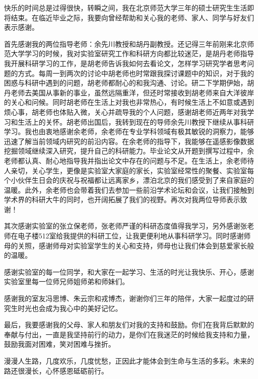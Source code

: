 
\begin{ack}
  快乐的时间总是过得很快，转瞬之间，我在北京师范大学三年的硕士研究生生活即将结束。在临近毕业之际，我要向曾经帮助和关心我的老师、家人、同学与好友们表示感谢。

  首先感谢我的两位指导老师：余先川教授和胡丹副教授。还记得三年前刚来北京师范大学学习的时候，我对实验室研究工作和科研方向都比较迷茫，是胡丹老师指导我开展科研学习的工作，是胡老师告诉我如何去看论文，怎样学习研究学者思考问题的方式。每周一到两次的讨论中胡老师也时常跟我探讨课题中的知识，对于我的困惑与科研中遇到的问题，胡老师都耐心的和我沟通、讨论。研二下学期伊始，胡丹老师去美国从事新的事业，虽然远隔重洋，但还时常接收到胡老师来自大洋彼岸的关心和问候。同时胡老师在生活上对我也非常热心，有时候生活上不如意或遇到烦心事，胡老师也体贴入微，关心并疏导我的个人问题，感谢胡老师近两年对我学习和生活上的关怀。胡老师出国后，我转到现在的导师余先川教授下继续从事科研学习。我也由衷地感谢余老师，余老师在专业学科领域有极其敏锐的洞察力，能够迅速了解当前领域内研究的前沿内容。在余老师的指导下，我能够在遥感影像数据挖掘领域继续深入研究，提升自己的科研能力。毕业论文从开题到撰写过程中，余老师都认真、耐心地指导我并指出论文中存在的问题与不足。在生活上，余老师待人亲切，关心学生，更像是实验室大家庭的家长，实验室经常性的聚餐、实验室每个小伙伴生日会的庆祝与祝福都让远离家乡，漂泊北京的我们感受到了来自家庭的温暖。此外，余老师也会带着我们去参加一些前沿学术论坛和会议，让我们接触到学术界的科研大牛的同时，也开阔拓展了我们的视野。再次对我两位导师表示致谢！

  其次感谢实验室的张立保老师，张老师严谨的科研态度值得我学习，另外感谢张老师在电子楼512室给我提供的科研工位，让我更便利地从事科研学习。同时感谢师母的关照，感谢师母对实验室学生的关心和支持，师母也让我们体会到慈爱家长般的温暖。

  感谢实验室的每一位同学，和大家在一起学习、生活的时光让我快乐、开心，感谢实验室里每一位师兄师姐师弟和师妹们。

  感谢我的室友冯思博、朱云宗和戎博杰，谢谢你们三年的陪伴，大家一起度过的研究生时光也会成为我心中的美好记忆。

  最后，我要感谢我的父母、家人和朋友们对我的支持和鼓励。你们在我背后默默的奉献与付出，一直是我坚持前行的动力，是你们在我迷茫的时候给我支持和力量，鼓励我面对困难，笑对困难与挫折。

  漫漫人生路，几度欢乐，几度忧愁，正因此才能体会到生命与生活的多彩。未来的路还很漫长，心怀感恩砥砺前行。

\end{ack}
